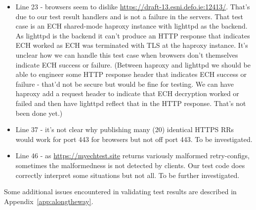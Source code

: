 \begin{itemize}
    \item Line 23 - browsers seem to dislike
        \url{https://draft-13.esni.defo.ie:12413/}.  That's due to our test
        result handlers and is not a failure in the servers. That test case is
        an ECH shared-mode haproxy instance with lighttpd as the backend. As
        lighttpd is the backend it can't produce an HTTP response that
        indicates ECH worked as ECH was terminated with TLS at the haproxy
        instance. It's unclear how we can handle this test case when browsers
        don't themselves indicate ECH success or failure. (Between haproxy and
        lighttpd we should be able to engineer some HTTP response header that
        indicates ECH success or failure - that'd not be secure but would be
        fine for testing. We can have haproxy add a request header to indicate
        that ECH decryption worked or failed and then have lighttpd reflect
        that in the HTTP response. That's not been done yet.)

    \item Line 37 - it's not clear why publishing many (20) identical HTTPS RRs
        would work for port 443 for browsers but not off port 443. To be
        investigated.

    \item Line 46 - as \url{https://myechtest.site} returns variously malformed
        retry-configs, sometimes the malformedness is not detected by clients.
        Our test code does correctly interpret some situations but not all.
        To be further investigated.

\end{itemize}

Some additional issues encountered in validating test results are described
in Appendix~\ref{app:alongtheway}.

